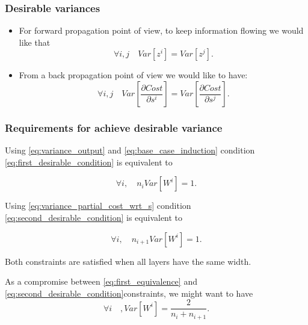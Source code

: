\begin{frame}
  \frametitle{Desirable variances}

    \begin{itemize}
      \item For forward propagation point of view, to keep information flowing we would like that 
      \begin{equation}
        \label{eq:first_desirable_condition}
        \forall i, j \quad Var\left[z^i\right] = Var\left[z^j\right]. 
      \end{equation}
      \item From a back propagation point of view we would like to have:
      \begin{equation}
        \label{eq:second_desirable_condition}
        \forall i, j \quad
        Var\left[
      \frac{\partial Cost}{ \partial s^i}
    \right]
    = 
    Var\left[
      \frac{\partial Cost}{ \partial s^j}
    \right]. 
      \end{equation}
    \end{itemize}
\end{frame}

\begin{frame}
  \frametitle{Requirements for achieve desirable variance}

  Using \ref{eq:variance_output} and \ref{eq:base_case_induction} condition \ref{eq:first_desirable_condition} is equivalent to 

  \begin{equation}
    \label{eq:first_equivalence}
    \forall i, \quad n_i Var\left[W^i\right] = 1.
  \end{equation}

  Using \ref{eq:variance_partial_cost_wrt_s} condition \ref{eq:second_desirable_condition} is equivalent to 

  \begin{equation}
    \label{eq:second_equivalence}
    \forall i, \quad n_{i+1} Var\left[W^i\right] = 1.
  \end{equation}


Both constraints are satisfied when all layers have the same width. 

  As a compromise between \ref{eq:first_equivalence} and 
  \ref{eq:second_desirable_condition}constraints, we might want to have 
  \begin{equation}
    \forall i \quad, 
    Var \left[
      W^i
    \right]
    = 
    \frac{2}{n_i + n_{i+1}}. 
  \end{equation}
\end{frame}

